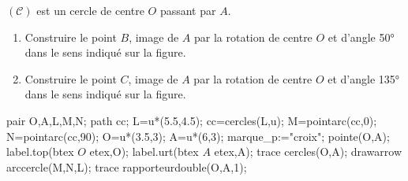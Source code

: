 \begin{exercice*}
    $(\mathcal{C})$ est un cercle de centre $O$ passant par $A$.
    \begin{enumerate}
        \item Construire le point $B$, image de $A$ par la rotation de centre $O$ et d'angle \ang{50} dans le sens indiqué sur la figure.
        \item Construire le point $C$, image de $A$ par la rotation de centre $O$ et d'angle \ang{135} dans le sens indiqué sur la figure.
    \end{enumerate}
    \begin{center}
        \begin{Geometrie}[CoinHD={(7u,6u)}]
            pair O,A,L,M,N;
            path cc;
            L=u*(5.5,4.5);
            cc=cercles(L,u);
            M=pointarc(cc,0);
            N=pointarc(cc,90);
            O=u*(3.5,3);
            A=u*(6,3);
            marque_p:="croix";
            pointe(O,A);
            label.top(btex $O$ etex,O);
            label.urt(btex $A$ etex,A);
            trace cercles(O,A);
            drawarrow arccercle(M,N,L);
            trace rapporteurdouble(O,A,1);
        \end{Geometrie}
    \end{center}
\end{exercice*}
